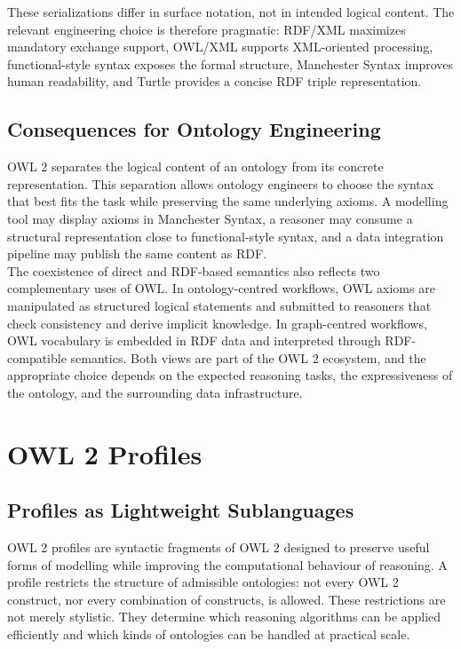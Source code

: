 \documentclass{scrbook}
\begin{document}
	These serializations differ in surface notation, not in intended logical content. The relevant engineering choice is therefore pragmatic: RDF/XML maximizes mandatory exchange support, OWL/XML supports XML-oriented processing, functional-style syntax exposes the formal structure, Manchester Syntax improves human readability, and Turtle provides a concise RDF triple representation.
	
	\section{Consequences for Ontology Engineering}
	
	OWL 2 separates the logical content of an ontology from its concrete representation. This separation allows ontology engineers to choose the syntax that best fits the task while preserving the same underlying axioms. A modelling tool may display axioms in Manchester Syntax, a reasoner may consume a structural representation close to functional-style syntax, and a data integration pipeline may publish the same content as RDF.\\
	
	The coexistence of direct and RDF-based semantics also reflects two complementary uses of OWL. In ontology-centred workflows, OWL axioms are manipulated as structured logical statements and submitted to reasoners that check consistency and derive implicit knowledge. In graph-centred workflows, OWL vocabulary is embedded in RDF data and interpreted through RDF-compatible semantics. Both views are part of the OWL 2 ecosystem, and the appropriate choice depends on the expected reasoning tasks, the expressiveness of the ontology, and the surrounding data infrastructure.
	
	\chapter{OWL 2 Profiles}
	
	\section{Profiles as Lightweight Sublanguages}
	
	OWL 2 profiles are syntactic fragments of OWL 2 designed to preserve useful forms of modelling while improving the computational behaviour of reasoning. A profile restricts the structure of admissible ontologies: not every OWL 2 construct, nor every combination of constructs, is allowed. These restrictions are not merely stylistic. They determine which reasoning algorithms can be applied efficiently and which kinds of ontologies can be handled at practical scale.\\
	
\end{document}
